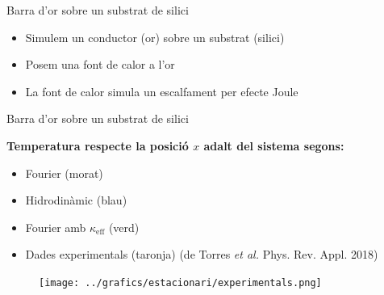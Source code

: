 \documentclass{beamer}
\begin{document}
\begin{frame}{Barra d'or sobre un substrat de silici}

\begin{figure}
\begin{center}

\end{center}
\end{figure}
\begin{itemize}
\item Simulem un conductor (or) sobre un substrat (silici)
\pause
\item Posem una font de calor a l'or
\pause
\item La font de calor simula un escalfament per efecte Joule
\end{itemize}
\end{frame}

\begin{frame}{Barra d'or sobre un substrat de silici}
\vspace{-3mm}
\begin{center}\textbf{Temperatura respecte la posici\'{o} $x$ adalt del sistema segons:}\end{center}
\begin{itemize}
\item Fourier (morat)

\item Hidrodin\`{a}mic (blau)

\item Fourier amb $\kappa_{\text{eff}}$ (verd)
\vspace{0.7mm}

\item Dades experimentals (taronja) \footnotesize{(de Torres \emph{et al.} Phys. Rev. Appl. 2018)}
\end{itemize}
\vspace{-2mm}
\begin{figure}
\begin{center}
\texttt{[image: ../grafics/estacionari/experimentals.png]}
\end{center}
\end{figure}
\end{frame}
\end{document}
